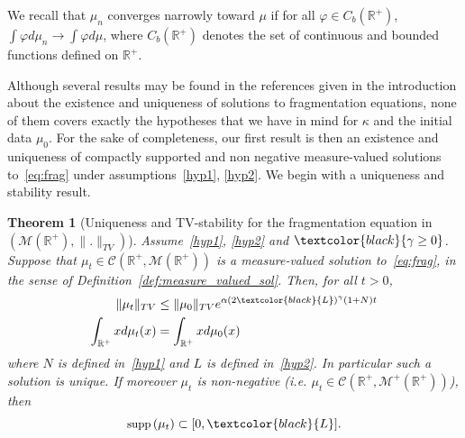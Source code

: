 \documentclass[10pt]{amsart}
\newtheorem{theo}{Theorem}[section]
\theoremstyle{definition}\newtheorem{defi}[theo]{Definition}\newtheorem{rema}[theo]{Remark}\newtheorem{exam}[theo]{Example}\newtheorem{exem}[theo]{Example}\newtheorem{nota}[theo]{Notation}
\newcommand*\dst{\displaystyle}
\newcommand*\R{\mathbb{R}}
\newcommand*\M{\mathcal{M}}
\newcommand{\clC}{\mathcal{C}}
\newcommand{\comMD}[1]{\textcolor{black}{#1}}
\newcommand{\MT}[1]{\textcolor{black}{#1}}
\newcommand*\supp{{\mbox{\small\rm supp}}\,}
\begin{document}
We recall that $\mu_n$ converges narrowly toward $\mu$ if for all $\varphi \in C_b(\R^+)$, $\int \varphi d\mu_n \to \int \varphi d\mu$, where $C_b(\R^+)$ denotes the set of continuous and bounded functions defined on $\R^+$.

Although several results may be found in the references given in the introduction about the existence and uniqueness of solutions to fragmentation equations, none of them covers exactly the hypotheses that we have in mind for $\kappa$ and the initial data $\mu _0$. For the sake of completeness, our first result is then an existence and uniqueness of compactly supported and non negative measure-valued solutions to~\eqref{eq:frag} under assumptions~\eqref{hyp1}, \eqref{hyp2}. We begin with a uniqueness and stability result.

\begin{theo}[Uniqueness and TV-stability for the fragmentation equation in $(\M(\R^+),\|.\|_{TV})$]\label{thm:WP_BV}
Assume~\eqref{hyp1}, \eqref{hyp2} and $\comMD{\gamma\geq 0}$. Suppose that $\mu _t\in \clC(\R^+, \M(\R^+))$ is a measure-valued solution to~\eqref{eq:frag}, in the sense of Definition~\ref{def:measure_valued_sol}.
Then, for all $t>0$,
\begin{align}
\|\mu_t\|_{TV} &\leq \|\mu_0\|_{TV} e^{\alpha (2\MT{L})^{\gamma} (1+N) t} \label{pgcd2}
\\
\dst\int_{\R^+} xd\mu_t(x) &=\dst\int_{\R^+} xd\mu_0(x) \label{pgcd3}
\end{align}
where $N$ is defined in~\eqref{hyp1} and $L$ is defined in~\eqref{hyp2}. In particular such a solution is unique.
If moreover $\mu_t$ is non-negative (i.e. $\mu_t \in \clC(\R^+,\M^+(\R^+))$), then
\begin{equation}\label{pgcd11}
\supp(\mu_t) \subset [0,\MT{L}]. 
\end{equation}
\end{theo}
\end{document}
